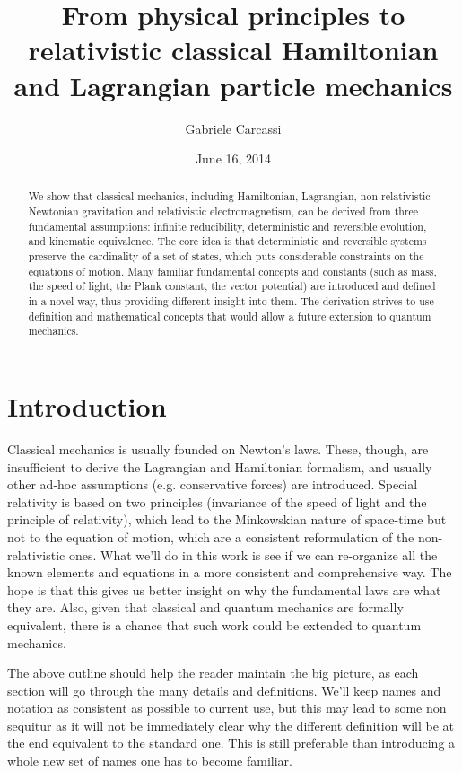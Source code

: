 \documentclass[aps,pra,10pt,twocolumn,floatfix,nofootinbib]{revtex4-1}
\theoremstyle{definition}
\begin{document}
\title{From physical principles to relativistic classical Hamiltonian and Lagrangian particle mechanics}
\author{Gabriele Carcassi}
\date{June 16, 2014}

\begin{abstract}
We show that classical mechanics, including Hamiltonian, Lagrangian, non-relativistic Newtonian gravitation and relativistic electromagnetism, can be derived from three fundamental assumptions: infinite reducibility, deterministic and reversible evolution, and kinematic equivalence. The core idea is that deterministic and reversible systems preserve the cardinality of a set of states, which puts considerable constraints on the equations of motion. Many familiar fundamental concepts and constants (such as mass, the speed of light, the Plank constant, the vector potential) are introduced and defined in a novel way, thus providing different insight into them. The derivation strives to use definition and mathematical concepts that would allow a future extension to quantum mechanics.\end{abstract}
\maketitle

\section{Introduction}


Classical mechanics is usually founded on Newton's laws. These, though, are insufficient to derive the Lagrangian and Hamiltonian formalism, and usually other ad-hoc assumptions (e.g. conservative forces) are introduced. Special relativity is based on two principles (invariance of the speed of light and the principle of relativity), which lead to the Minkowskian nature of space-time but not to the equation of motion, which are a consistent reformulation of the non-relativistic ones. What we'll do in this work is see if we can re-organize all the known elements and equations in a more consistent and comprehensive way. The hope is that this gives us better insight on why the fundamental laws are what they are. Also, given that classical and quantum mechanics are formally equivalent, there is a chance that such work could be extended to quantum mechanics.

The above outline should help the reader maintain the big picture, as each section will go through the many details and definitions. We'll keep names and notation as consistent as possible to current use, but this may lead to some non sequitur as it will not be immediately clear why the different definition will be at the end equivalent to the standard one. This is still preferable than introducing a whole new set of names one has to become familiar.
\end{document}
